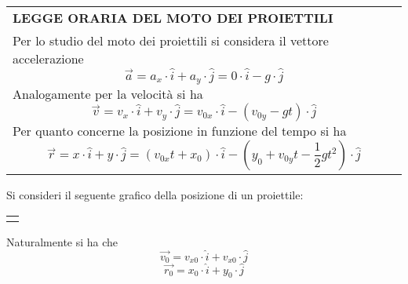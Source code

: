 \documentclass[a4paper]{extarticle}
\renewcommand\arraystretch{}
\begin{document}
\vspace{1em}
\setlength{\tabcolsep}{14pt}
\renewcommand{\arraystretch}{2}
\noindent
\begin{tabularx}{\textwidth}{@{}|P|@{}}
    \hline
    {\textbf{LEGGE ORARIA DEL MOTO DEI PROIETTILI}}\\
    \parbox{\linewidth}{Per lo studio del moto dei proiettili si considera il vettore accelerazione
    \[\boxed{\vec{a} = a_x \cdot \hat{i} + a_y \cdot \hat{j} = 0 \cdot \hat{i} - g \cdot \hat{j}}\]
    Analogamente per la velocità si ha
    \[\boxed{\vec{v} = v_x \cdot \hat{i} + v_y \cdot \hat{j} = v_{0x} \cdot \hat{i} - (v_{0y} - g t) \cdot \hat{j}}\]
    Per quanto concerne la posizione in funzione del tempo si ha
    \[\boxed{\vec{r} = x \cdot \hat{i} + y \cdot \hat{j} = (v_{0x} t + x_0) \cdot \hat{i} - (y_0 + v_{0y} t - \frac{1}{2} g t^2) \cdot \hat{j}}\]
    \vspace{-1mm}}\\
    \hline
\end{tabularx}

\vspace{2em}
\noindent
Si consideri il seguente grafico della posizione di un proiettile:

\vspace{2em}
\noindent
{}
\begin{tabularx}{\textwidth}{P}
  {
      \centering
  }
\end{tabularx}

\vspace{1em}
\noindent
Naturalmente si ha che
\[\vec{v_{0}} = v_{x0} \cdot \hat{i} + v_{x0} \cdot \hat{j}\]
\[\vec{r_{0}} = x_0 \cdot \hat{i} + y_0 \cdot \hat{j}\]
\end{document}
